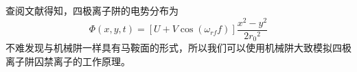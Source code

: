 \documentclass{WHUReport}
\begin{document}
\begin{multicols}{2}
	查阅文献得知，四极离子阱的电势分布为
	\begin{equation}
		\Phi(x,y,t)=\left[U+V\cos(\omega_{rf}f)\right]\frac{x^2-y^2}{2{r_0}^2}
	\end{equation}
	不难发现与机械阱一样具有马鞍面的形式，所以我们可以使用机械阱大致模拟四极离子阱囚禁离子的工作原理。
	
	\small
	
	
\end{multicols}
\end{document}
